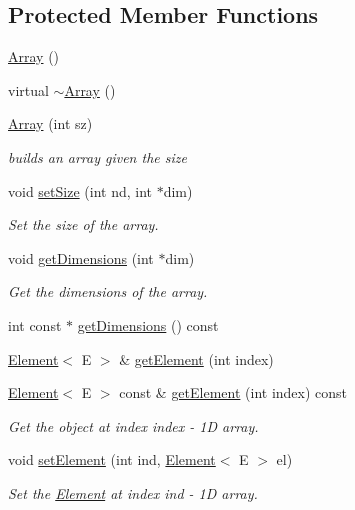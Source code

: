 \subsection*{Protected Member Functions}
\begin{DoxyCompactItemize}
\item 
\hyperlink{classbridges_1_1datastructure_1_1_array_a23cb659c4f39e5e6f3b29a58e97b8e0d}{Array} ()
\item 
virtual \hyperlink{classbridges_1_1datastructure_1_1_array_a5a9f212f560e9673259eece27d8f11cc}{$\sim$\+Array} ()
\item 
\hyperlink{classbridges_1_1datastructure_1_1_array_ad72d4311346c5b9e53ee8eff2a4aadce}{Array} (int sz)
\begin{DoxyCompactList}\small\item\em builds an array given the size \end{DoxyCompactList}\item 
void \hyperlink{classbridges_1_1datastructure_1_1_array_a2bfb10e98b1745a7ca173459626352a9}{set\+Size} (int nd, int $\ast$dim)
\begin{DoxyCompactList}\small\item\em Set the size of the array. \end{DoxyCompactList}\item 
void \hyperlink{classbridges_1_1datastructure_1_1_array_aa2a14939c8e53087e833ebf71822a057}{get\+Dimensions} (int $\ast$dim)
\begin{DoxyCompactList}\small\item\em Get the dimensions of the array. \end{DoxyCompactList}\item 
int const  $\ast$ \hyperlink{classbridges_1_1datastructure_1_1_array_a6d9edc546fa172a47f19de3c2ea93ebf}{get\+Dimensions} () const
\item 
\hyperlink{classbridges_1_1datastructure_1_1_element}{Element}$<$ E $>$ \& \hyperlink{classbridges_1_1datastructure_1_1_array_aaf44dbc671651d6e1383d1c523348f28}{get\+Element} (int index)
\item 
\hyperlink{classbridges_1_1datastructure_1_1_element}{Element}$<$ E $>$ const  \& \hyperlink{classbridges_1_1datastructure_1_1_array_ad2704d36d824ef7356fda5f6d7974ba7}{get\+Element} (int index) const
\begin{DoxyCompactList}\small\item\em Get the object at index index -\/ 1D array. \end{DoxyCompactList}\item 
void \hyperlink{classbridges_1_1datastructure_1_1_array_a120174198dc4de388af154d97951e856}{set\+Element} (int ind, \hyperlink{classbridges_1_1datastructure_1_1_element}{Element}$<$ E $>$ el)
\begin{DoxyCompactList}\small\item\em Set the \hyperlink{classbridges_1_1datastructure_1_1_element}{Element} at index ind -\/ 1D array. \end{DoxyCompactList}\end{DoxyCompactItemize}
